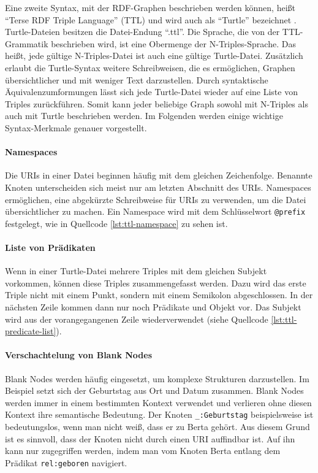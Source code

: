Eine zweite Syntax, mit der RDF-Graphen beschrieben werden können, heißt "`Terse RDF Triple Language"' (TTL) und wird auch als "`Turtle"' bezeichnet  \cite[vgl.][]{w3c2014turtle}. Turtle-Dateien besitzen die Datei-Endung "`.ttl"'.
Die Sprache, die von der TTL-Grammatik beschrieben wird, ist eine Obermenge der N-Triples-Sprache. Das heißt, jede gültige N-Triples-Datei ist auch eine gültige Turtle-Datei. Zusätzlich erlaubt die Turtle-Syntax weitere Schreibweisen, die es ermöglichen, Graphen übersichtlicher und mit weniger Text darzustellen. Durch syntaktische Äquivalenzumformungen lässt sich jede Turtle-Datei wieder auf eine Liste von Triples zurückführen. Somit kann jeder beliebige Graph sowohl mit N-Triples als auch mit Turtle beschrieben werden. Im Folgenden werden einige wichtige Syntax-Merkmale genauer vorgestellt.
\paragraph{Namespaces}

Die URIs in einer Datei beginnen häufig mit dem gleichen Zeichenfolge. Benannte Knoten unterscheiden sich meist nur am letzten Abschnitt des URIs. Namespaces ermöglichen, eine abgekürzte Schreibweise für URIs zu verwenden, um die Datei übersichtlicher zu machen. Ein Namespace wird mit dem Schlüsselwort \lstinline|@prefix| festgelegt, wie in Quellcode \ref{lst:ttl-namespace} zu sehen ist.

\paragraph{Liste von Prädikaten}
Wenn in einer Turtle-Datei mehrere Triples mit dem gleichen Subjekt vorkommen, können diese Triples zusammengefasst werden. Dazu wird das erste Triple nicht mit einem Punkt, sondern mit einem Semikolon abgeschlossen. In der nächsten Zeile kommen dann nur noch Prädikate und Objekt vor. Das Subjekt wird aus der vorangegangenen Zeile wiederverwendet (siehe Quellcode \ref{lst:ttl-predicate-list}).

\paragraph{Verschachtelung von Blank Nodes}
Blank Nodes werden häufig eingesetzt, um komplexe Strukturen darzustellen. Im Beispiel setzt sich der Geburtstag aus Ort und Datum zusammen. Blank Nodes werden immer in einem bestimmten Kontext verwendet und verlieren ohne diesen Kontext ihre semantische Bedeutung. Der Knoten \lstinline|_:Geburtstag| beispielsweise ist bedeutungslos, wenn man nicht weiß, dass er zu Berta gehört. Aus diesem Grund ist es sinnvoll, dass der Knoten nicht durch einen URI auffindbar ist. Auf ihn kann nur zugegriffen werden, indem man vom Knoten Berta entlang dem Prädikat \lstinline|rel:geboren| navigiert.


